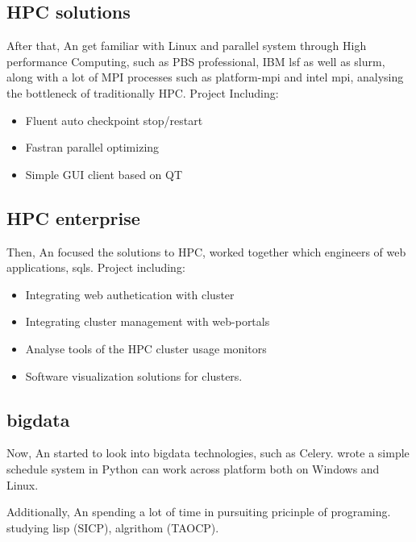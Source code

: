 \documentclass[letterpaper]{twentysecondcv} %
\begin{document}
\subsection{{\small HPC solutions}}
After that, An get familiar with Linux and parallel system through High performance Computing, such as PBS professional, IBM lsf as well as slurm, along with a lot of MPI processes such as platform-mpi and intel mpi, analysing the bottleneck of traditionally HPC. 
Project Including:

  \begin{itemize}
  \item Fluent auto checkpoint  stop/restart
  \item Fastran parallel optimizing
  \item Simple GUI client based on QT
  \end{itemize}

\subsection{{\small HPC enterprise}}
Then, An focused the solutions to HPC, worked together which engineers of web applications, sqls. 
Project including:
{\small
  \begin{itemize}
  \item Integrating web authetication with cluster 
  \item Integrating cluster management with web-portals
  \item Analyse tools of the HPC cluster usage monitors
  \item Software visualization solutions for clusters.
  \end{itemize}
}

\subsection{{\small bigdata}}

Now, An started to look into bigdata technologies, such as Celery.
wrote a simple schedule system in Python can work across platform both on Windows and Linux. 

Additionally, An spending a lot of time in pursuiting pricinple of programing. studying lisp (SICP), algrithom (TAOCP).
\end{document}
